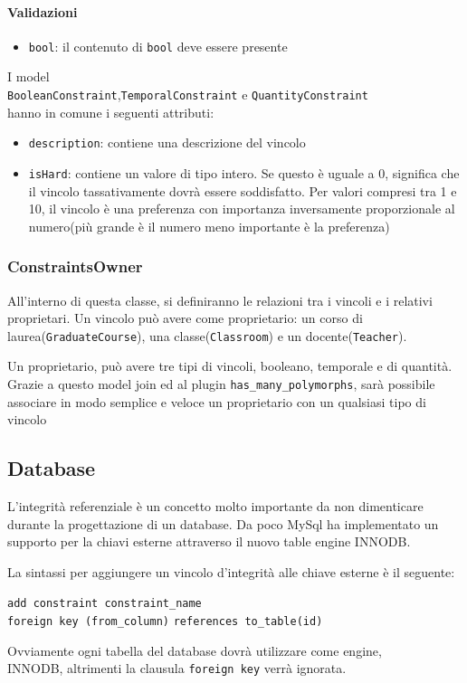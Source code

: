 \documentclass[11pt,a4paper]{article}
\begin{document}
\paragraph{Validazioni}
\begin{itemize}
 \item \verb|bool|: il contenuto di \verb|bool| deve essere presente
\end{itemize}
I model \\
\verb|BooleanConstraint|,\verb|TemporalConstraint| e \verb|QuantityConstraint| \\
hanno in comune i seguenti attributi:
\begin{itemize}
 \item \verb|description|: contiene una descrizione del vincolo
 \item \verb|isHard|: contiene un valore di tipo intero. Se questo è uguale a 0, significa che il vincolo tassativamente dovrà essere soddisfatto. Per valori compresi tra 1 e 10, il vincolo è una preferenza con importanza inversamente proporzionale al numero(più grande è il numero meno importante è la preferenza)  	
 \end{itemize}
\subsubsection{ConstraintsOwner}
All'interno di questa classe, si definiranno le relazioni tra i vincoli e i relativi proprietari.
Un vincolo può avere come proprietario: un corso di laurea(\verb|GraduateCourse|), una classe(\verb|Classroom|) e un docente(\verb|Teacher|).


Un proprietario, può avere tre tipi di vincoli, booleano, temporale e di quantità.
Grazie a questo model join ed al plugin \verb|has_many_polymorphs|, sarà possibile associare in modo semplice e veloce un proprietario con un qualsiasi tipo di vincolo
\subsection{Database}
L'integrità referenziale è un concetto molto importante da non dimenticare durante la progettazione di un database.
Da poco MySql ha implementato un supporto per la chiavi esterne attraverso il nuovo table engine INNODB.


La sintassi per aggiungere un vincolo d'integrità alle chiave esterne è il seguente:\\ 
\begin{center}
\verb|add constraint constraint_name|\\
\verb|foreign key (from_column)|
\verb|references to_table(id)|   
\end{center}
Ovviamente ogni tabella del database dovrà utilizzare come engine,\\ INNODB, altrimenti la clausula \verb|foreign key| verrà ignorata. 
\end{document}
